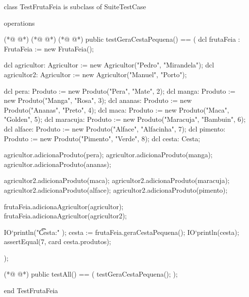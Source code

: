 \begin{vdmpp}[breaklines=true]
class TestFrutaFeia is subclass of SuiteTestCase

operations 

(*@
\label{testGeraCestaPequena:5}
@*)
(*@
\label{testGeraCesta:5}
@*)
(*@
\label{testFrutaFeia:5}
@*)
public testGeraCestaPequena() == (
 dcl frutaFeia : FrutaFeia := new FrutaFeia();
 
 dcl agricultor: Agricultor := new Agricultor("Pedro", "Mirandela"); 
 dcl agricultor2: Agricultor := new Agricultor("Manuel", "Porto");
 

 dcl pera: Produto := new Produto("Pera", "Mate", 2);
 dcl manga: Produto := new Produto("Manga", "Rosa", 3);
 dcl ananas: Produto := new Produto("Ananas", "Preto", 4);
 dcl maca: Produto := new Produto("Maca", "Golden", 5);
 dcl maracuja: Produto := new Produto("Maracuja", "Bambuin", 6);
  dcl alface: Produto := new Produto("Alface", "Alfacinha", 7);
  dcl pimento: Produto := new Produto("Pimento", "Verde", 8);
 dcl cesta: Cesta;
 
 agricultor.adicionaProduto(pera);
 agricultor.adicionaProduto(manga);
 agricultor.adicionaProduto(ananas);
 
 agricultor2.adicionaProduto(maca);
 agricultor2.adicionaProduto(maracuja);
 agricultor2.adicionaProduto(alface);
 agricultor2.adicionaProduto(pimento);
 
 frutaFeia.adicionaAgricultor(agricultor);
 frutaFeia.adicionaAgricultor(agricultor2);
 
 IO`println("\t\t Cesta:" );
 cesta := frutaFeia.geraCestaPequena();
 IO`println(cesta); 
 assertEqual(7, card cesta.produtos);
 
);


(*@
\label{testAll:41}
@*)
public testAll() == (
  testGeraCestaPequena();
);

end TestFrutaFeia
\end{vdmpp}
